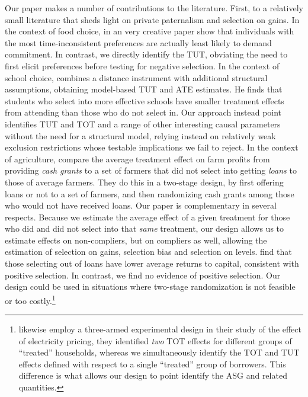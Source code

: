 \documentclass[12pt, a4paper]{article}
\begin{document}

Our paper makes a number of contributions to the literature. First, %
to a relatively small literature that sheds light on private paternalism and selection on gains. In the context of food choice, in an very creative paper \cite{Sprenger} show that individuals with the most time-inconsistent preferences are actually least likely to demand commitment. In contrast, we directly identify the TUT, obviating the need to first elicit preferences before testing for negative selection. In the context of school choice, \cite{Walters} combines a distance instrument with additional structural assumptions, obtaining model-based TUT and ATE estimates. He finds that students who select into more effective schools have smaller treatment effects from attending than those who do not select in. Our approach instead point identifies TUT and TOT and a range of other interesting causal parameters without the need for a structural model, relying instead on relatively weak exclusion restrictions whose testable implications we fail to reject. In the context of agriculture, \cite{Beaman2023} compare the average treatment effect on farm profits from providing \textit{cash grants} to a set of farmers that did not select into getting \textit{loans} to those of average farmers. They do this in a two-stage design, by first offering loans or not to a set of farmers, and then randomizing cash grants among those who would not have received loans. Our paper is complementary in several respects. Because we estimate the average effect of a given treatment for those who did and did not select into that \textit{same} treatment, our design allows us to estimate effects on non-compliers, but on compliers as well, allowing the estimation of selection on gains, selection bias and selection on levels.  \cite{Beaman2023} find that those selecting out of loans have lower average returns to capital, consistent with positive selection. In contrast, we find no evidence of positive selection. Our design could be used in situations where two-stage randomization is not feasible or too costly.\footnote{\cite{fowlie2021default} likewise employ a three-armed experimental design in their study of the effect of electricity pricing, they identified \emph{two} TOT effects for different groups of ``treated'' households, whereas we simultaneously identify the TOT and TUT effects defined with respect to a single ``treated'' group of borrowers. This difference is what allows our design to point identify the ASG and related quantities.}
\end{document}
